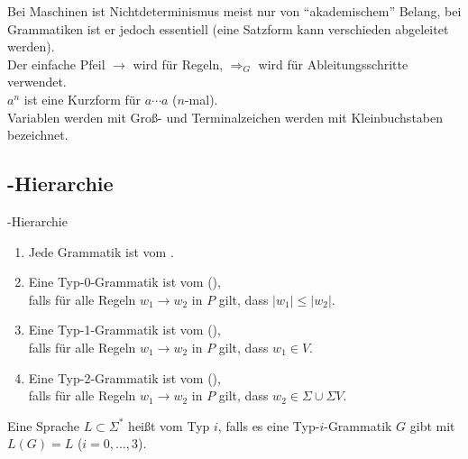 \begin{Bem}
    Bei Maschinen ist Nichtdeterminismus meist nur von "`akademischem"'
    Belang, bei Grammatiken ist er jedoch essentiell
    (eine Satzform kann verschieden abgeleitet werden).\\
    Der einfache Pfeil $\rightarrow$ wird für Regeln,
    $\Rightarrow_G$ wird für Ableitungsschritte verwendet.\\
    $a^n$ ist eine Kurzform für $a \dotsb a$ ($n$-mal).\\
    Variablen werden mit Groß- und
    Terminalzeichen werden mit Kleinbuchstaben bezeichnet.
\end{Bem}

\subsection{%
    -Hierarchie%
}

\begin{Def}{-Hierarchie}
    \begin{enumerate}[label=\emph{Typ \arabic*}:,start=0,
                      leftmargin=20mm,labelsep=5mm]
        \item
        Jede Grammatik ist vom .

        \item
        Eine Typ-0-Grammatik ist vom 
        (),\\
        falls für alle Regeln $w_1 \rightarrow w_2$ in $P$
        gilt, dass $|w_1| \le |w_2|$.

        \item
        Eine Typ-1-Grammatik ist vom 
        (),\\
        falls für alle Regeln $w_1 \rightarrow w_2$ in $P$
        gilt, dass $w_1 \in V$.

        \item
        Eine Typ-2-Grammatik ist vom 
        (),\\
        falls für alle Regeln $w_1 \rightarrow w_2$ in $P$
        gilt, dass $w_2 \in \Sigma \cup \Sigma V$.
    \end{enumerate}
    Eine Sprache $L \subset \Sigma^\ast$ heißt
    vom Typ $i$, falls es eine Typ-$i$-Grammatik $G$ gibt mit $L(G) = L$
    ($i = 0, \dotsc, 3$).
\end{Def}

